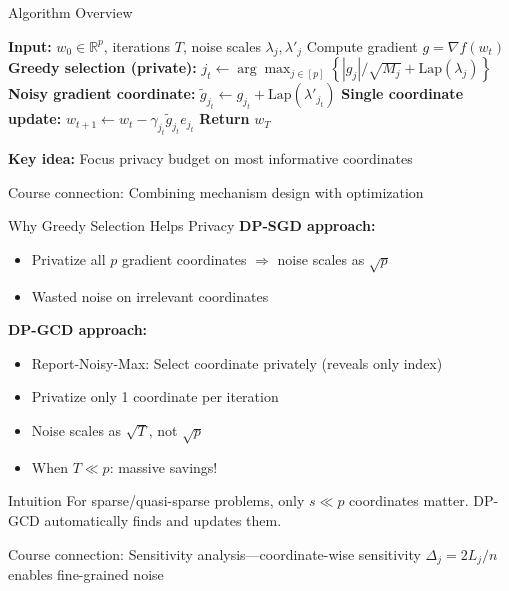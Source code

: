 \documentclass{beamer}
\begin{document}
\begin{frame}{Algorithm Overview}
\begin{algorithm}[H]
\caption{DP-GCD (Simplified)}
\footnotesize
\begin{algorithmic}[1]
\State \textbf{Input:} $w_0 \in \mathbb{R}^p$, iterations $T$, noise scales $\lambda_j, \lambda'_j$
    \State Compute gradient $g = \nabla f(w_t)$
    \State \textbf{Greedy selection (private):} $j_t \gets \arg\max_{j \in [p]} \left\{ |g_j|/\sqrt{M_j} + \mathrm{Lap}(\lambda_j) \right\}$
    \State \textbf{Noisy gradient coordinate:} $\tilde{g}_{j_t} \gets g_{j_t} + \mathrm{Lap}(\lambda'_{j_t})$
    \State \textbf{Single coordinate update:} $w_{t+1} \gets w_t - \gamma_{j_t} \tilde{g}_{j_t} e_{j_t}$
\EndFor
\State \textbf{Return} $w_T$
\end{algorithmic}
\end{algorithm}

\vspace{0.5em}

\textbf{Key idea:} Focus privacy budget on most informative coordinates

\vspace{0.3em}

\alert{Course connection:} Combining mechanism design with optimization
\end{frame}

\begin{frame}{Why Greedy Selection Helps Privacy}
\textbf{DP-SGD approach:}
\begin{itemize}
\item Privatize all $p$ gradient coordinates $\Rightarrow$ noise scales as $\sqrt{p}$
\item Wasted noise on irrelevant coordinates
\end{itemize}

\vspace{1em}

\textbf{DP-GCD approach:}
\begin{itemize}
\item Report-Noisy-Max: Select coordinate privately (reveals only index)
\item Privatize only 1 coordinate per iteration
\item Noise scales as $\sqrt{T}$, not $\sqrt{p}$
\item When $T \ll p$: massive savings!
\end{itemize}

\vspace{1em}

\begin{block}{Intuition}
For sparse/quasi-sparse problems, only $s \ll p$ coordinates matter. DP-GCD automatically finds and updates them.
\end{block}

\vspace{0.3em}

\alert{Course connection:} Sensitivity analysis—coordinate-wise sensitivity $\Delta_j = 2L_j/n$ enables fine-grained noise
\end{frame}
\end{document}
